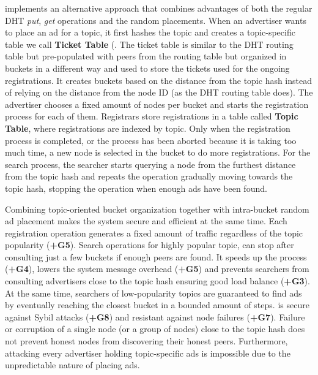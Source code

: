 \sysname implements an alternative approach that combines advantages of both the regular DHT \emph{put}, \emph{get} operations and the random placements. 
When an advertiser wants to place an ad for a topic,  it first hashes the topic and creates a topic-specific table we call \textbf{Ticket Table} (. 
The ticket table is similar to the DHT routing table but pre-populated with peers from the routing table but organized in buckets in a different way and used to store the tickets used for the ongoing registrations.
It creates buckets based on the distance from the topic hash instead of relying on the distance from the node ID (as the DHT routing table does). 
The advertiser chooses a fixed amount of nodes per bucket and starts the registration process for each of them.
Registrars store registrations in a table called \textbf{Topic Table},  where registrations are indexed by topic.
Only when the registration process is completed, or the process has been aborted because it is taking too much time, a new node is selected in the bucket to do more registrations. 
For the search process,  the searcher starts querying  a node from the furthest distance from the topic hash and repeats the operation gradually moving towards the topic hash,  stopping the operation when enough ads have been found.

Combining topic-oriented bucket organization together with intra-bucket random ad placement makes the system secure and efficient at the same time. 
Each registration operation generates a fixed amount of traffic regardless of the topic popularity (\textbf{+G5}). 
Search operations for highly popular topic, can stop after consulting just a few buckets if enough peers are found. 
It speeds up the process (\textbf{+G4}), lowers the system message overhead (\textbf{+G5}) and prevents searchers from consulting advertisers close to the topic hash ensuring good load balance (\textbf{+G3}). 
At the same time, searchers of low-popularity topics are guaranteed to find ads by eventually reaching the closest bucket in a bounded amount of steps. 
\sysname is secure against Sybil attacks (\textbf{+G8}) and resistant against node failures (\textbf{+G7}). Failure or corruption of a single node (or a group of nodes) close to the topic hash does not prevent honest nodes from discovering their honest peers. 
Furthermore, attacking every advertiser holding topic-specific ads is impossible due to the unpredictable nature of placing ads. 


